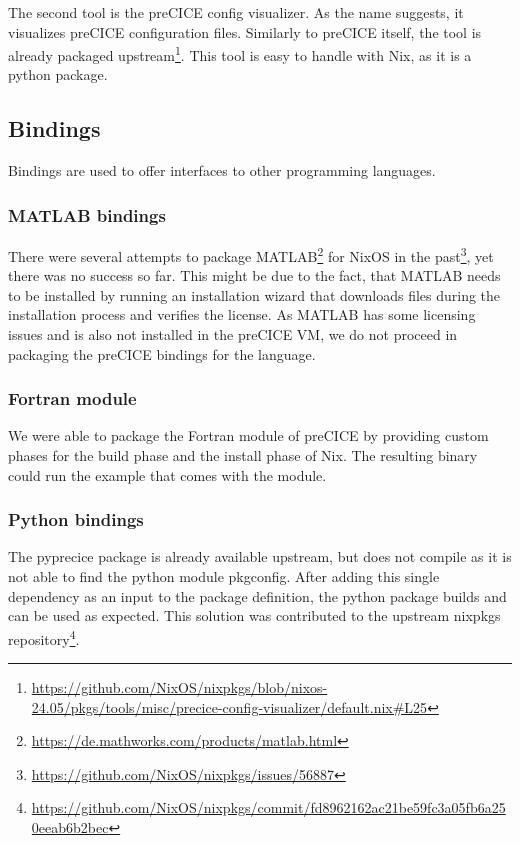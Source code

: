 \documentclass{eceasst}
\begin{document}
The second tool is the preCICE config visualizer.
As the name suggests, it visualizes preCICE configuration files.
Similarly to preCICE itself, the tool is already packaged upstream\footnote{\url{https://github.com/NixOS/nixpkgs/blob/nixos-24.05/pkgs/tools/misc/precice-config-visualizer/default.nix\#L25}}.
This tool is easy to handle with Nix, as it is a python package.

\subsection{Bindings}

Bindings are used to offer interfaces to other programming languages.

\subsubsection{MATLAB bindings}

There were several attempts to package MATLAB\footnote{\url{https://de.mathworks.com/products/matlab.html}} for NixOS in the past\footnote{\url{https://github.com/NixOS/nixpkgs/issues/56887}}, yet there was no success so far.
This might be due to the fact, that MATLAB needs to be installed by running an installation wizard that downloads files during the installation process and verifies the license.
As MATLAB has some licensing issues and is also not installed in the preCICE VM, we do not proceed in packaging the preCICE bindings for the language.

\subsubsection{Fortran module}

We were able to package the Fortran module of preCICE by providing custom phases for the build phase and the install phase of Nix.
The resulting binary could run the example that comes with the module.

\subsubsection{Python bindings}

The pyprecice package is already available upstream, but does not compile as it is not able to find the python module pkgconfig.
After adding this single dependency as an input to the package definition, the python package builds and can be used as expected.
This solution was contributed to the upstream nixpkgs repository\footnote{\url{https://github.com/NixOS/nixpkgs/commit/fd8962162ac21be59fc3a05fb6a250eeab6b2bec}}.
\end{document}
